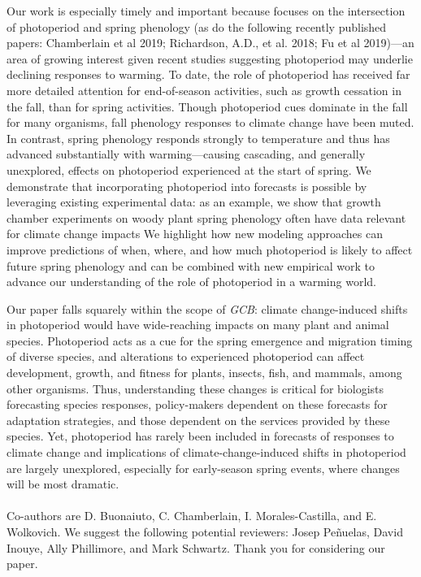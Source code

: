 \documentclass[10.7pt,a4paper]{letter} %
\begin{document}
\begin{letter}{}
Our work is especially timely and important because focuses on the intersection of photoperiod and spring phenology (as do the following recently published papers: Chamberlain et al 2019; Richardson, A.D., et al. 2018; Fu et al 2019)---an area of growing interest given recent studies suggesting photoperiod may underlie declining responses to warming. To date, the role of photoperiod has received far more detailed attention for end-of-season activities, such as growth cessation in the fall, than for spring activities. Though photoperiod cues dominate in the fall for many organisms, fall phenology responses to climate change have been muted. In contrast, spring phenology responds strongly to temperature and thus has advanced substantially with warming---causing cascading, and generally unexplored, effects on photoperiod experienced at the start of spring. We demonstrate that incorporating photoperiod into forecasts is possible by leveraging existing experimental data: as an example, we show that growth chamber experiments on woody plant spring phenology often have data relevant for climate change impacts %
We highlight how new modeling approaches can improve predictions of when, where, and how much photoperiod is likely to affect future spring phenology and can be combined with new empirical work to advance our understanding of the role of photoperiod in a warming world. %

Our paper falls squarely within the scope of \emph{GCB}: climate change-induced shifts in photoperiod would have wide-reaching impacts on many plant and animal species. Photoperiod acts as a cue for the spring emergence and migration timing of diverse species, and alterations to experienced photoperiod can affect development, growth, and fitness for plants, insects, fish, and mammals, among other organisms. Thus, understanding these changes is critical for biologists forecasting species responses, policy-makers dependent on these forecasts for adaptation strategies, and those dependent on the services provided by these species. Yet, photoperiod has rarely been included in forecasts of responses to climate change and implications of climate-change-induced shifts in photoperiod are largely unexplored, especially for early-season spring events, where changes will be most dramatic. 
\\
\\
Co-authors are D. Buonaiuto, C. Chamberlain, I. Morales-Castilla, and E. Wolkovich. We suggest the following potential reviewers: Josep Pe\~nuelas, David Inouye, Ally Phillimore, and Mark Schwartz.
Thank you for considering our paper.


\end{letter}
\end{document}
